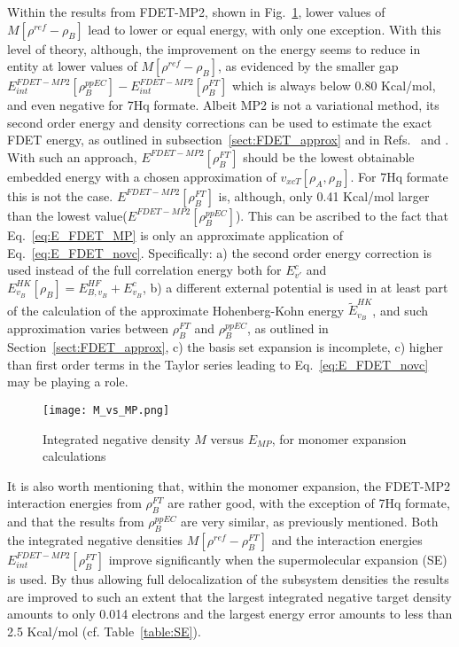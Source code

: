 \documentclass[journal=jctcce,manuscript=article, layout=twocolumn]{achemso}
\begin{document}
Within the results from FDET-MP2, shown in Fig.~\ref{fig:M_vs_MP}, lower values of $M[\rho^{ref} - \rho_B]$ lead to lower or equal energy, with only one exception.
With this level of theory, although, the improvement on the energy seems to reduce in entity at lower values of $M[\rho^{ref} - \rho_B]$, as evidenced by the smaller gap $E^{FDET-MP2}_{int}[\rho_B^{ppEC}] - E^{FDET-MP2}_{int}[\rho_B^{FT}]$ which is always below 0.80 Kcal/mol, and even negative for 7Hq formate.
Albeit MP2 is not a variational method, its second order energy and density corrections can be used to estimate the exact FDET energy, as outlined in subsection~\ref{sect:FDET_approx} and in Refs.~ and . With such an approach, $E^{FDET-MP2}[\rho_B^{FT}]$ should be the lowest obtainable embedded energy with a chosen approximation of $v_{xcT}[\rho_A,\rho_B]$. For 7Hq formate this is not the case. $E^{FDET-MP2}[\rho_B^{FT}]$ is, although, only 0.41 Kcal/mol larger than the lowest value($E^{FDET-MP2}[\rho_B^{ppEC}]$). This can be ascribed to the fact that Eq.~\ref{eq:E_FDET_MP} is only an approximate application of Eq.~\ref{eq:E_FDET_novc}. Specifically: a) the second order energy correction is used instead of the full correlation energy both for $E^c_{v'}$ and $E^{HK}_{v_B}[\rho_B] = E^{HF}_{B,v_B}+E^c_{v_B}$, b) a different external potential is used in at least part of the calculation of the approximate Hohenberg-Kohn energy $\tilde{E}^{HK}_{v_B}$, and such approximation varies between $\rho_B^{FT}$ and $\rho_B^{ppEC}$, as outlined in Section~\ref{sect:FDET_approx}, c) the basis set expansion is incomplete, c) higher than first order terms in the Taylor series leading to Eq.~\ref{eq:E_FDET_novc} may be playing a role.

\begin{figure}[H]
\centering
\texttt{[image: M\_vs\_MP.png]}
\caption{Integrated negative density $M$ versus $E_{MP}$, for monomer expansion calculations}
\label{fig:M_vs_MP}
\end{figure}

It is also worth mentioning that, within the monomer expansion, the FDET-MP2 interaction energies from $\rho_B^{FT}$ are rather good, with the exception of 7Hq formate, and that the results from  $\rho_B^{ppEC}$ are very similar, as previously mentioned. Both the integrated negative densities $M[\rho^{ref} - \rho^{FT}_{B}]$ and the interaction energies $E^{FDET-MP2}_{int}[\rho^{FT}_B]$ improve significantly when the supermolecular expansion (SE) is used. By thus allowing full delocalization of the subsystem densities the results are improved to such an extent that the largest integrated negative target density amounts to only 0.014 electrons and the largest energy error amounts to less than 2.5 Kcal/mol (cf. Table~\ref{table:SE}).
\end{document}
